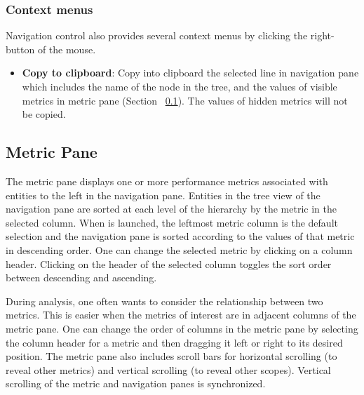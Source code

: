 \subsubsection{Context menus}
Navigation control also provides several context menus by clicking the right-button of the mouse. 
\begin{itemize}
 \item \textbf{Copy to clipboard}: Copy into clipboard the selected line in navigation pane which includes the name of the node in the tree, and the values of visible metrics in metric pane (Section ~\ref{sec:pane-metric}). The values of hidden metrics will not be copied.
\end{itemize}



\subsection{Metric Pane}
\label{sec:pane-metric}

The metric pane displays one or more performance metrics associated with entities to the left in the navigation pane.
Entities in the tree view of the navigation pane are sorted at each level of the hierarchy by the metric in the selected column.
When \hpcviewer{} is launched, the leftmost metric column is the default selection and the navigation pane is sorted according to the values of that metric in descending order.
One can change the selected metric by clicking on a column header.
Clicking on the header of the selected column toggles the sort order between descending and ascending.

During analysis, one often wants to consider the relationship between two metrics.
This is easier when the metrics of interest are in adjacent columns of the metric pane.
One can change the order of columns in the metric pane by selecting the column header for a metric and then dragging it left or right to its desired position.
The metric pane also includes scroll bars for horizontal scrolling (to reveal other metrics) and vertical scrolling (to reveal other scopes).
Vertical scrolling of the metric and navigation panes is synchronized.





